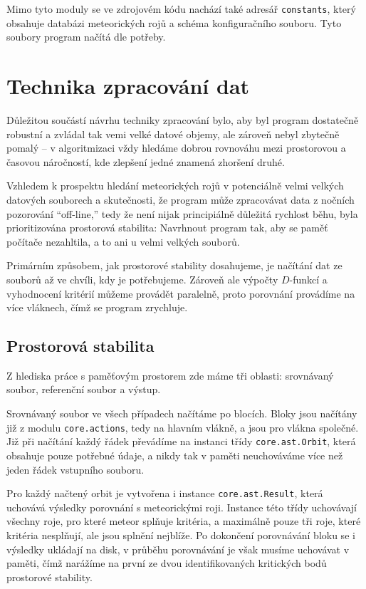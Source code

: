 \smallskip

Mimo tyto moduly se ve zdrojovém kódu nachází také adresář \texttt{constants}, který obsahuje databázi meteorických rojů a schéma konfiguračního souboru. Tyto soubory program načítá dle potřeby.

\section{Technika zpracování dat}%
Důležitou součástí návrhu techniky zpracování bylo, aby byl program dostatečně robustní a zvládal tak vemi velké datové objemy, ale zároveň nebyl zbytečně pomalý -- v algoritmizaci vždy hledáme dobrou rovnováhu mezi prostorovou a časovou náročností, kde zlepšení jedné znamená zhoršení druhé.

Vzhledem k prospektu hledání meteorických rojů v potenciálně velmi velkých datových souborech a skutečnosti, že program může zpracovávat data z nočních pozorování "`off-line,"' tedy že není nijak principiálně důležitá rychlost běhu, byla prioritizována prostorová stabilita: Navrhnout program tak, aby se paměť počítače nezahltila, a to ani u velmi velkých souborů.

\smallskip

Primárním způsobem, jak prostorové stability dosahujeme, je načítání dat ze souborů až ve chvíli, kdy je potřebujeme. Zároveň ale výpočty $D$-funkcí a vyhodnocení kritérií můžeme provádět paralelně, proto porovnání provádíme na více vláknech, čímž se program zrychluje.

\subsection{Prostorová stabilita}
Z hlediska práce s paměťovým prostorem zde máme tři oblasti: srovnávaný soubor, referenční soubor a výstup.

\medskip

Srovnávaný soubor ve všech případech načítáme po blocích. Bloky jsou načítány již z modulu \texttt{core.actions}, tedy na hlavním vlákně, a jsou pro vlákna společné. Již při načítání každý řádek převádíme na instanci třídy \texttt{core.ast.Orbit}, která obsahuje pouze potřebné údaje, a nikdy tak v paměti neuchováváme více než jeden řádek vstupního souboru.

Pro každý načtený orbit je vytvořena i instance \texttt{core.ast.Result}, která uchovává výsledky porovnání s meteorickými roji. Instance této třídy uchovávají všechny roje, pro které meteor splňuje kritéria, a maximálně pouze tři roje, které kritéria nesplňují, ale jsou splnění nejblíže. Po dokončení porovnávání bloku se i výsledky ukládají na disk, v průběhu porovnávání je však musíme uchovávat v paměti, čímž narážíme na první ze dvou identifikovaných kritických bodů prostorové stability.

